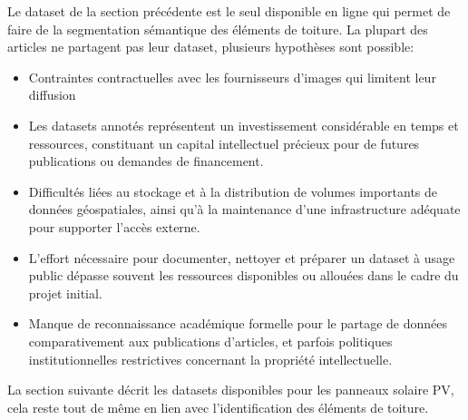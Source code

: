 {{{{\par{Le dataset de la section précédente est le seul disponible en ligne qui permet de faire de la segmentation sémantique des éléments de toiture. La plupart des articles ne partagent pas leur dataset, plusieurs hypothèses sont possible:}
\begin{itemize}
    \item Contraintes contractuelles avec les fournisseurs d'images qui limitent leur diffusion
    \item Les datasets annotés représentent un investissement considérable en temps et ressources, constituant un capital intellectuel précieux pour de futures publications ou demandes de financement.    
    \item Difficultés liées au stockage et à la distribution de volumes importants de données géospatiales, ainsi qu'à la maintenance d'une infrastructure adéquate pour supporter l'accès externe.
    \item L'effort nécessaire pour documenter, nettoyer et préparer un dataset à usage public dépasse souvent les ressources disponibles ou allouées dans le cadre du projet initial.
    \item Manque de reconnaissance académique formelle pour le partage de données comparativement aux publications d'articles, et parfois politiques institutionnelles restrictives concernant la propriété intellectuelle.
\end{itemize}
\par{La section suivante décrit les datasets disponibles pour les panneaux solaire PV, cela reste tout de même en lien avec l'identification des éléments de toiture.}

}}}}
